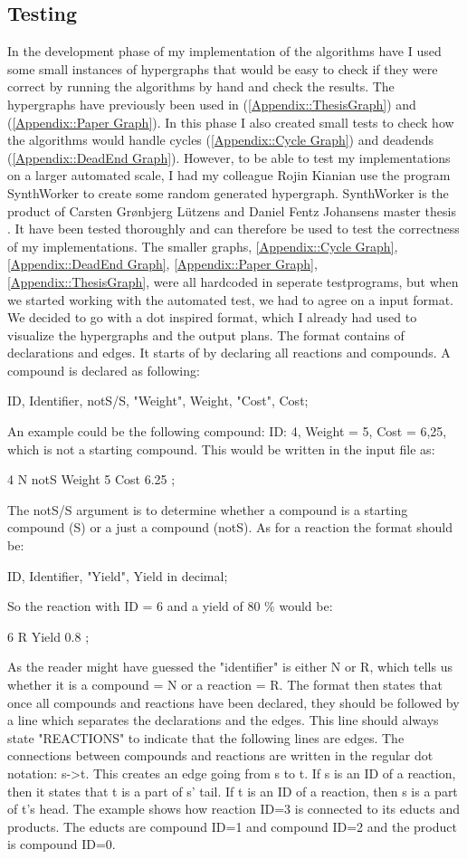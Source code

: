 \documentclass[a4paper,10pt,titlepage]{paper}
\begin{document}
\subsection{Testing}
In the development phase of my implementation of the algorithms have I used some small instances of hypergraphs that would be easy to check if they were correct by running the algorithms by hand and check the results. The hypergraphs have previously been used in \cite{Carsten} (\ref{Appendix::ThesisGraph}) and \cite{Fagerberg} (\ref{Appendix::Paper Graph}). In this phase I also created small tests to check how the algorithms would handle cycles (\ref{Appendix::Cycle Graph}) and deadends (\ref{Appendix::DeadEnd Graph}).
However, to be able to test my implementations on a larger automated scale, I had my colleague Rojin Kianian use the program SynthWorker to create some random generated hypergraph. SynthWorker is the product of Carsten Grønbjerg Lützens and Daniel Fentz Johansens master thesis \cite{Carsten}. It have been tested thoroughly and can therefore be used to test the correctness of my implementations.
The smaller graphs, \ref{Appendix::Cycle Graph},\ref{Appendix::DeadEnd Graph}, \ref{Appendix::Paper Graph}, \ref{Appendix::ThesisGraph}, were all hardcoded in seperate testprograms, but when we started working with the automated test, we had to agree on a input format. We decided to go with a dot inspired format, which I already had used to visualize the hypergraphs and the output plans. The format contains of declarations and edges. It starts of by declaring all reactions and compounds. A compound is declared as following:
\begin{center}
ID, Identifier, notS/S, "Weight", Weight, "Cost", Cost;
\end{center}
An example could be the following compound: ID: 4, Weight = 5, Cost = 6,25, which is not a starting compound. This would be written in the input file as:
\begin{center}
4 N notS Weight 5 Cost 6.25 ;
\end{center}
The notS/S argument is to determine whether a compound is a starting compound (S) or a just a compound (notS).
As for a reaction the format should be:
\begin{center}
ID, Identifier, "Yield", Yield in decimal;
\end{center}
So the reaction with ID = 6 and a yield of 80 \% would be:
\begin{center}
6 R Yield 0.8 ;
\end{center}
As the reader might have guessed the "identifier" is either N or R, which tells us whether it is a compound = N or a reaction = R. The format then states that once all compounds and reactions have been declared, they should be followed by a line which separates the declarations and the edges. This line should always state "REACTIONS" to indicate that the following lines are edges. The connections between compounds and reactions are written in the regular dot notation: s->t. This creates an edge going from s to t. If s is an ID of a reaction, then it states that t is a part of s' tail. If t is an ID of a reaction, then s is a part of t's head. The example shows how reaction ID=3 is connected to its educts and products. The educts are compound ID=1 and compound ID=2 and the product is compound ID=0.
\end{document}
